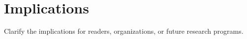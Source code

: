 \section{Implications}

Clarify the implications for readers, organizations, or future research programs.
